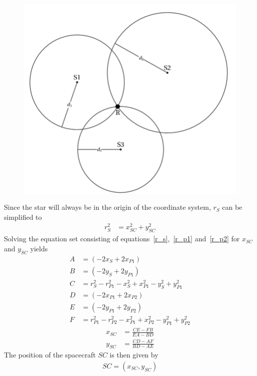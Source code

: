 \documentclass[reprint,english,notitlepage]{revtex4-2}
\begin{document}
\begin{figure}[h]
	\centering
	\includegraphics[scale=0.2]{Figures/trilateration}
	\label{fig:trilateration_figure} %
\end{figure}
Since the star will always be in the origin of the coordinate system, $r_S$ can be simplified to
\begin{align*}
    r_S^2 &= x_{SC}^2 + y_{SC}^2
\end{align*}
Solving the equation set consisting of equations~\eqref{r_s},~\eqref{r_p1} and~\eqref{r_p2} for $x_{SC}$ and $y_{SC}$ yields
\begin{align*}
    A& = \left(-2x_S + 2x_{P1}\right)\\
	B& = \left(-2y_S + 2y_{P1}\right)\\
	C& = r_S^2 - r_{P1}^2 - x_S^2 + x_{P1}^2 - y_S^2 + y_{P1}^2\\
	D& = \left(-2x_{P1} + 2x_{P2}\right)\\
	E& = \left(-2y_{P1} + 2y_{P2}\right)\\
	F& = r_{P1}^2 - r_{P2}^2 - x_{P1}^2 + x_{P2}^2 - y_{P1}^2 + y_{P2}^2
\end{align*}
\begin{align*}
    x_{SC}& = \frac{CE - FB}{EA - BD}\\
	y_{SC}& = \frac{CD - AF}{BD - AE}
\end{align*}
The position of the spacecraft $SC$ is then given by
\begin{align*}
    SC = \left(x_{SC}, y_{SC} \right)
\end{align*}
\end{document}
